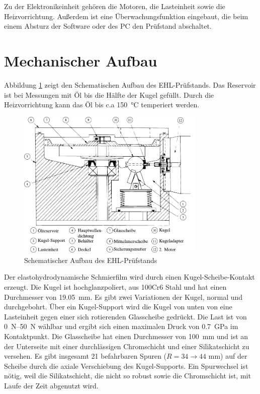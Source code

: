 Zu der Elektronikeinheit gehören die Motoren, die Lasteinheit sowie die Heizvorrichtung.
Außerdem ist eine Überwachungsfunktion eingebaut, die beim einem Absturz der Software oder des PC den Prüfstand abschaltet.

\section{Mechanischer Aufbau}
\label{sec:mechanischer_aufbau}

Abbildung \ref{fig:ehl_aufbau} zeigt den Schematischen Aufbau des EHL-Prüfstands.
Das Reservoir ist bei Messungen mit Öl bis die Hälfte der Kugel gefüllt.
Durch die Heizvorrichtung kann das Öl bis c.a \SI{150}{\degreeCelsius} temperiert werden.
\begin{figure}[htb]
    \centering
    \includegraphics[width=0.8\textwidth]{./images/ehd_pruefstand_aufbau.pdf}
    \caption{Schematischer Aufbau des EHL-Prüfstands \cite{ehl}}
    \label{fig:ehl_aufbau}
\end{figure}
%
Der elastohydrodynamische Schmierfilm wird durch einen Kugel-Scheibe-Kontakt erzeugt.
Die Kugel ist hochglanzpoliert, aus 100Cr6 Stahl und hat einen Durchmesser von \SI{19.05}{\milli\meter}.
Es gibt zwei Variationen der Kugel, normal und durchgebohrt.
Über ein Kugel-Support wird die Kugel von unten von eine Lasteinheit gegen einer sich rotierenden Glasscheibe gedrückt.
Die Last ist von \SIrange{0}{50}{\newton} wählbar und ergibt sich einen maximalen Druck von \SI{0.7}{\giga\pascal} im Kontaktpunkt.
Die Glasscheibe hat einen Durchmesser von \SI{100}{\milli\meter} und ist an der Unterseite mit einer durchlässigen Chromschicht und einer Silikatschicht zu versehen.
Es gibt insgesamt \num{21} befahrbaren Spuren ($R = 34 \rightarrow 44$ \si{\milli\meter}) auf der Scheibe durch die axiale Verschiebung des Kugel-Supports.
Ein Spurwechsel ist nötig, weil die Silikatschicht, die nicht so robust sowie die Chromschicht ist, mit Laufe der Zeit abgenutzt wird.

